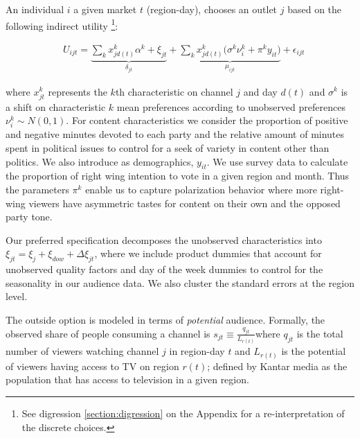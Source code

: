 \documentclass[12pt]{article}
\begin{document}


 An individual $ i $  a given market $ t $ (region-day), chooses an outlet $ j $ based on the following indirect utility \footnote{See digression \ref{section:digression} on the Appendix for a re-interpretation of the discrete choices.}: 


\begin{equation}\label{eq:utility}
	\begin{aligned}
		& U_{ijt}= \underbrace{\sum_k x_{jd(t)}^k\alpha^k+ \xi_{jt}}_{\delta_{jt}}  + \underbrace{  \sum_k x_{jd(t)}^k \Big( \sigma^k \nu_{i}^k  + \pi^ky_{it} \Big)}_{\mu_{ijt}}+\epsilon_{ijt} 
	\end{aligned}
\end{equation} 

where $ x_{jt}^k $ represents the $ k $th characteristic on channel $ j $ and day $ d(t) $ and $ \sigma^k $ is a shift on characteristic $ k $ mean preferences according to unobserved preferences $ \nu_{i}^k \sim N(0,1)$. For content characteristics we consider the proportion of positive and negative minutes devoted to each party and the relative amount  of minutes spent in political issues to control for a seek of variety in content other than politics.  We also introduce as demographics, $ y_{it} $. We use survey data to calculate the proportion of right wing intention to vote in a given region and month. Thus the parameters $\pi^k$ enable us to capture polarization behavior where more right-wing viewers have asymmetric tastes for content on their own and the opposed party tone. 

Our preferred specification decomposes the unobserved characteristics into $\xi_{jt}= \xi_j + \xi_{dow} + \Delta \xi_{jt}$, where we include product dummies that account for unobserved quality factors and day of the week dummies to control for the seasonality in our audience data. We also cluster the standard errors at the region level. 

The outside option is modeled in terms of \textit{potential} audience. Formally, the observed share of people consuming a channel  is $ s_{jt}\equiv \frac{q_{jt}}{L_{r(t)}}$where $ q_{jt} $ is the total number of viewers watching channel $ j $ in region-day $ t $ and  $ L_{r(t)} $ is the potential of viewers having access to TV on region $ r(t) $; defined by Kantar media as the population that has access to television in a given region. 
\end{document}
